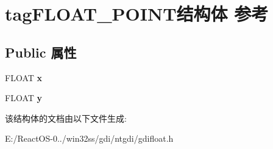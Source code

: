 \hypertarget{structtag_f_l_o_a_t___p_o_i_n_t}{}\section{tag\+F\+L\+O\+A\+T\+\_\+\+P\+O\+I\+N\+T结构体 参考}
\label{structtag_f_l_o_a_t___p_o_i_n_t}
\subsection*{Public 属性}
\begin{DoxyCompactItemize}
\item 
\mbox{\label{structtag_f_l_o_a_t___p_o_i_n_t_a52959cc53b8d9a5e5d867fb8da748007}} 
F\+L\+O\+AT {\bfseries x}
\item 
\mbox{\label{structtag_f_l_o_a_t___p_o_i_n_t_a283e1652da83fe946e4878b72fa43bf2}} 
F\+L\+O\+AT {\bfseries y}
\end{DoxyCompactItemize}


该结构体的文档由以下文件生成\+:\begin{DoxyCompactItemize}
\item 
E\+:/\+React\+O\+S-\/0../win32ss/gdi/ntgdi/gdifloat.\+h\end{DoxyCompactItemize}
